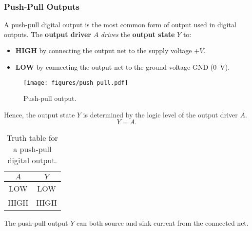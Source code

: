 \documentclass{article}
\begin{document}
\subsubsection{Push-Pull Outputs}
A push-pull digital output is the most common form of output used in
digital outputs. The \textbf{output driver} \(A\) \textit{drives} the
\textbf{output state} \(Y\) to:
\begin{itemize}
    \item \textbf{HIGH} by connecting the output net to the supply voltage \(+\unit{V}\).
    \item \textbf{LOW} by connecting the output net to the ground voltage GND (\qty{0}{V}).
\end{itemize}
\begin{figure}[H]
    \centering
    \texttt{[image: figures/push\_pull.pdf]}
    \caption{Push-pull output.} %
\end{figure}
Hence, the output state \(Y\) is determined by the logic level of the output driver \(A\).
\begin{equation*}
    Y = A.
\end{equation*}
\begin{table}[H]
    \centering
    \begin{tabular}{c | c}
        \toprule
        \textbf{\(A\)} & \textbf{\(Y\)} \\
        \midrule
        LOW            & LOW            \\
        HIGH           & HIGH           \\
        \bottomrule
    \end{tabular}
    \caption{Truth table for a push-pull digital output.} %
\end{table}
The push-pull output \(Y\) can both source and sink current from the connected net.
\end{document}
